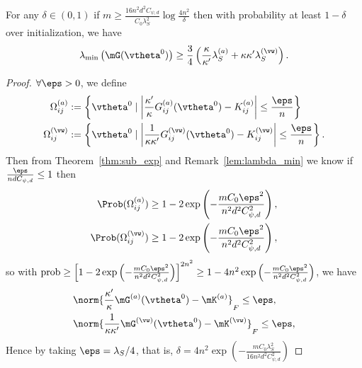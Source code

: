 \documentclass{article}
\begin{document}
\begin{lem}\label{lem:lambda_min}
    For any $\delta\in(0,1)$ if $m\geq\frac{16n^2d^2C_{\psi,d}}{C_0\lambda_S^2}\log\frac{4n^2}{\delta}$ then with probability at least $1-\delta$ over initialization, we have
    \begin{equation}
        \lambda_{\min}\left(\mG(\vtheta^0)\right)\geq\frac{3}{4}\left(\frac{\kappa}{\kappa'}\lambda_S^{(a)}+\kappa\kappa'\lambda_S^{(\vw)}\right).
    \end{equation}
\end{lem}
\begin{proof}
    $\forall \eps > 0$, we define
    \begin{equation}
        \begin{aligned}
            \Omega_{ij}^{(a)}   & :=\left\{\vtheta^0 \mid \left\lvert \frac{\kappa'}{\kappa}G^{(a)}_{ij}(\vtheta^0) - K^{(a)}_{ij}\right\rvert \leq \frac{\eps}{n} \right\}        \\
            \Omega_{ij}^{(\vw)} & := \left\{\vtheta^0 \mid \left\lvert \frac{1}{\kappa\kappa'}G^{(\vw)}_{ij}(\vtheta^0) - K^{(\vw)}_{ij}\right\rvert \leq \frac{\eps}{n} \right\}.
        \end{aligned}
    \end{equation}
    Then from Theorem~\ref{thm:sub_exp} and Remark~\ref{lem:lambda_min} we know if $\frac{\eps}{ndC_{\psi,d}}\leq 1$ then
    \begin{equation}
        \begin{aligned}
            \Prob(\Omega^{(a)}_{ij})   & \geq 1-2\exp\left(-\frac{mC_0\eps^2}{n^2d^2C_{\psi,d}^2}\right), \\
            \Prob(\Omega^{(\vw)}_{ij}) & \geq 1-2\exp\left(-\frac{mC_0\eps^2}{n^2d^2C_{\psi,d}^2}\right),
        \end{aligned}
    \end{equation}
    so with $\mathrm{prob}\geq \left[1-2\exp\left(-\frac{mC_0\eps^2}{n^2d^2C_{\psi,d}^2}\right)\right]^{2n^2} \geq 1-4n^2\exp\left(-\frac{mC_0\eps^2}{n^2d^2C_{\psi,d}^2}\right)$, we have
    \begin{equation}
        \begin{aligned}
             & \norm{\frac{\kappa'}{\kappa}\mG^{(a)}(\vtheta^0) - \mK^{(a)}}_F \leq \eps,      \\
             & \norm{\frac{1}{\kappa\kappa'}\mG^{(\vw)}(\vtheta^0) - \mK^{(\vw)}}_F \leq \eps,
        \end{aligned}
    \end{equation}
    Hence by taking $\eps=\lambda_S/4$, that is, $\delta=4n^2\exp\left(-\frac{mC_0\lambda_S^2}{16n^2d^2C_{\psi,d}^2}\right)$

\end{proof}
\end{document}
